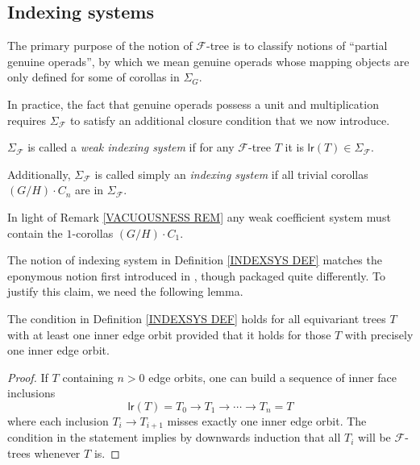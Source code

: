 \documentclass[a4paper,10pt]{article}%
\begin{document}
\subsection{Indexing systems}


The primary purpose of the notion of $\mathcal{F}$-tree is to classify notions of ``partial genuine operads'', by which we mean genuine operads whose mapping objects are only defined for some of corollas in 
$\Sigma_G$.

In practice, the fact that genuine operads possess a unit and multiplication requires $\Sigma_{\mathcal{F}}$ to satisfy an additional closure condition that we now introduce.

\begin{definition}\label{INDEXSYS DEF}
  $\Sigma_{\mathcal{F}}$ is called a 
  \textit{weak indexing system}
  if for any $\mathcal{F}$-tree $T$ it is 
  $\mathsf{lr}(T) \in \Sigma_{\mathcal{F}}$.
  
  Additionally, $\Sigma_{\mathcal{F}}$ is called simply an \textit{indexing system} if all trivial corollas 
  $(G/H)\cdot C_n$ are in $\Sigma_{\mathcal{F}}$.
\end{definition}


\begin{remark}
  In light of Remark \ref{VACUOUSNESS REM} any weak coefficient system must contain the $1$-corollas $(G/H) \cdot C_1$.
\end{remark}

The notion of indexing system in Definition \ref{INDEXSYS DEF} matches the eponymous notion first introduced in 
\cite[Def. 3.22]{BH15}, though packaged quite differently.
To justify this claim, we need the following lemma.


\begin{lemma}
  The condition in Definition \ref{INDEXSYS DEF}
  holds for all equivariant trees $T$ with at least one inner edge orbit provided that it holds for those $T$ with precisely one inner edge orbit.
\end{lemma}


\begin{proof}
  If $T$ containing $n>0$ edge orbits, one can build a sequence of inner face inclusions
  \[
  \mathsf{lr}(T) = T_0
  \to
  T_1
  \to 
  \cdots
  \to
  T_n= T
  \]
  where each inclusion $T_i \to T_{i+1}$ misses exactly one inner edge orbit. The condition in the statement implies by downwards induction that all $T_i$ will be $\mathcal{F}$-trees whenever $T$ is.
\end{proof}
\end{document}
